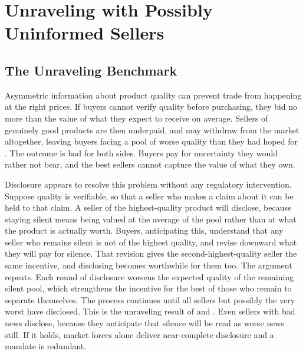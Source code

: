 %

\section{Unraveling with Possibly Uninformed Sellers}
\label{sec:unraveling}

\subsection{The Unraveling Benchmark}

Asymmetric information about product quality can prevent trade from happening at the right
prices. If buyers cannot verify quality before purchasing, they bid no more than the value of
what they expect to receive on average. Sellers of genuinely good products are then underpaid,
and may withdraw from the market altogether, leaving buyers facing a pool of worse quality than
they had hoped for \citep{akerlof_lemons_1970}. The outcome is bad for both sides. Buyers pay for
uncertainty they would rather not bear, and the best sellers cannot capture the value of what
they own.

Disclosure appears to resolve this problem without any regulatory intervention. Suppose quality
is verifiable, so that a seller who makes a claim about it can be held to that claim. A seller
of the highest-quality product will disclose, because staying silent means being valued at the
average of the pool rather than at what the product is actually worth. Buyers, anticipating
this, understand that any seller who remains silent is not of the highest quality, and revise
downward what they will pay for silence. That revision gives the second-highest-quality seller
the same incentive, and disclosing becomes worthwhile for them too. The argument repeats. Each
round of disclosure worsens the expected quality of the remaining silent pool, which strengthens
the incentive for the best of those who remain to separate themselves. The process continues
until all sellers but possibly the very worst have disclosed. This is the unraveling result of
\citet{grossman_informational_1981} and \citet{milgrom_good_1981}. Even sellers with bad news
disclose, because they anticipate that silence will be read as worse news still. If it holds,
market forces alone deliver near-complete disclosure and a mandate is redundant.

